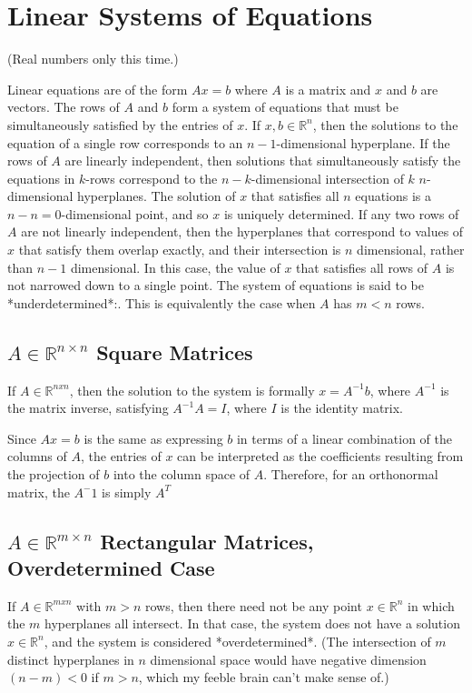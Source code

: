 \section{Linear Systems of Equations}
\label{sec:linearequations}

(Real numbers only this time.)

Linear equations are of the form $Ax = b$ where $A$ is a matrix and $x$ and $b$ are vectors. The rows of $A$ and $b$ form a system of equations that must be simultaneously satisfied by the entries of $x$. If $x,b\in\mathbb{R}^n$, then the solutions to the equation of a single row corresponds to an $n-1$-dimensional hyperplane. If the rows of $A$ are linearly independent, then solutions that simultaneously satisfy the equations in $k$-rows correspond to the $n-k$-dimensional intersection of $k$ $n$-dimensional hyperplanes. The solution of $x$ that satisfies all $n$ equations is a $n-n = 0$-dimensional point, and so $x$ is uniquely determined. If any two rows of $A$ are not linearly independent, then the hyperplanes that correspond to values of $x$ that satisfy them overlap exactly, and their intersection is $n$ dimensional, rather than $n-1$ dimensional. In this case, the value of $x$ that satisfies all rows of $A$ is not narrowed down to a single point. The system of equations is said to be *underdetermined*:. This is equivalently the case when $A$ has $m<n$ rows.  

\subsection{$A\in\mathbb{R}^{n\times n}$ Square Matrices}
If $A\in\mathbb{R}^{nxn}$, then the solution to the system is formally $x = A^{-1}b$, where $A^{-1}$ is the matrix inverse, satisfying $A^{-1}A=I$, where $I$ is the identity matrix. 

Since $Ax=b$ is the same as expressing $b$ in terms of a linear combination of the columns of $A$, the entries of $x$ can be interpreted as the coefficients resulting from the projection of $b$ into the column space of $A$. Therefore, for an orthonormal matrix, the $A^-1$ is simply $A^T$ 

\subsection{$A\in\mathbb{R}^{m\times n}$ Rectangular Matrices, Overdetermined Case}
If $A\in\mathbb{R}^{mxn}$ with $m>n$ rows, then there need not be any point $x\in\mathbb{R}^n$ in which the $m$ hyperplanes all intersect. In that case, the system does not have a solution $x\in\mathbb{R}^n$, and the system is considered *overdetermined*. (The intersection of $m$ distinct hyperplanes in $n$ dimensional space would have negative dimension $(n-m)<0$ if $m>n$, which my feeble brain can't make sense of.)
\\


